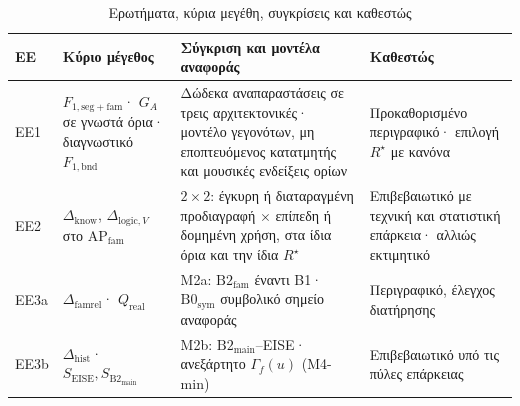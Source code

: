 \documentclass[a4paper]{article}
\newcommand{\dhist}{\ensuremath{\Delta_{\mathrm{hist}}}}
\newcommand{\Rs}{\ensuremath{R^{\star}}}
\newcommand{\Qreal}{\ensuremath{Q_{\mathrm{real}}}}
\begin{document}
\begin{table}[htbp]
\caption{Ερωτήματα, κύρια μεγέθη, συγκρίσεις και καθεστώς}\label{tab:questions}
\footnotesize
\begin{tabularx}{\linewidth}{@{}L{0.85cm}L{3.3cm}YL{2.7cm}@{}}
\toprule
\textbf{ΕΕ} & \textbf{Κύριο μέγεθος} & \textbf{Σύγκριση και μοντέλα αναφοράς} & \textbf{Καθεστώς}\\\midrule
ΕΕ1 & $F_{1,\mathrm{seg+fam}}$· $G_A$ σε γνωστά όρια· διαγνωστικό $F_{1,\mathrm{bnd}}$ & Δώδεκα αναπαραστάσεις σε τρεις αρχιτεκτονικές· μοντέλο γεγονότων, μη εποπτευόμενος κατατμητής και μουσικές ενδείξεις ορίων & Προκαθορισμένο περιγραφικό· επιλογή $\Rs$ με κανόνα\\
ΕΕ2 & $\Delta_{\mathrm{know}}$, $\Delta_{\mathrm{logic},V}$ στο $\mathrm{AP}_{\mathrm{fam}}$ & $2\times2$: έγκυρη ή διαταραγμένη προδιαγραφή $\times$ επίπεδη ή δομημένη χρήση, στα ίδια όρια και την ίδια $\Rs$ & Επιβεβαιωτικό με τεχνική και στατιστική επάρκεια· αλλιώς εκτιμητικό\\
ΕΕ3a & $\Delta_{\mathrm{famrel}}$· $\Qreal$ & Μ2a: $\mathrm{B2}_{\mathrm{fam}}$ έναντι B1· $\mathrm{B0}_{\mathrm{sym}}$ συμβολικό σημείο αναφοράς & Περιγραφικό, έλεγχος διατήρησης\\\midrule
ΕΕ3b & $\dhist$· $S_{\mathrm{EISE}},S_{\mathrm{B2}_{\mathrm{main}}}$ & Μ2b: $\mathrm{B2}_{\mathrm{main}}$--EISE· ανεξάρτητο $\Gamma_f(u)$ (Μ4-min) & Επιβεβαιωτικό υπό τις πύλες επάρκειας\\\bottomrule
\end{tabularx}
\end{table}
\end{document}
